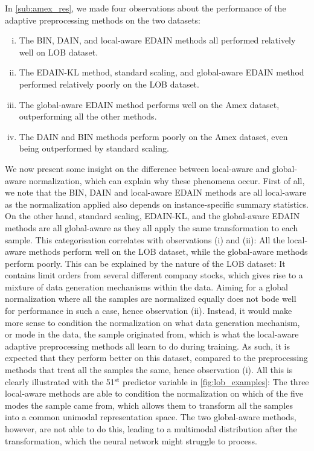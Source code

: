 \documentclass{statsmsc}
\begin{document}
{In \cref{sub:amex_res}, we made four observations about the performance of the adaptive
preprocessing methods on the two datasets:
\begin{enumerate}[(i)]
    \item The \ac{BIN}, \ac{DAIN}, and local-aware \ac{EDAIN} methods
        all performed relatively well on \ac{LOB} dataset.
    \item The EDAIN-KL method, standard scaling, and global-aware EDAIN method performed
        relatively poorly on the \ac{LOB} dataset.
    \item The global-aware \ac{EDAIN} method performs well on the Amex dataset,
        outperforming all the other methods.
    \item The \ac{DAIN} and \ac{BIN} methods perform poorly on the Amex dataset,
        even being outperformed by standard scaling.
\end{enumerate}
We now present some insight on the difference between local-aware and global-aware
normalization, which can explain why these phenomena occur.
%
First of all, we note that the \ac{BIN}, \ac{DAIN} and local-aware \ac{EDAIN} methods are
all local-aware as the normalization applied also depends on instance-specific summary statistics.
On the other hand, standard scaling, \ac{EDAIN-KL}, and the global-aware \ac{EDAIN} methods are
all global-aware as they all apply the same transformation to each sample. This categorisation
correlates with observations (i) and (ii): All the local-aware methods perform well on the
\ac{LOB} dataset, while the global-aware methods perform poorly.
This can be explained by the nature of the \ac{LOB} dataset: It contains limit orders from several
different company stocks, which gives rise to a mixture of data generation mechanisms within the
data. Aiming for a global normalization where all the samples are normalized equally does not bode
well for performance in such a case, hence observation (ii). Instead, it would make more sense to
condition the normalization on what data generation mechanism, or mode in the data, the sample
originated from, which is what the local-aware adaptive preprocessing methods
all learn to do during training. As such, it is expected that they perform better on this dataset,
compared to the preprocessing methods that treat all the samples the same, hence observation (i).
All this is clearly illustrated with the 51$^{\textrm{st}}$ predictor variable
in \cref{fig:lob_examples}:
The three local-aware methods are able to condition the normalization on which
of the five modes the sample came from, which allows them to transform all the samples into a common
unimodal representation space. The two global-aware methods, however, are not able to do this,
leading to a multimodal distribution after the transformation, which the neural network might
struggle to process.

}
\end{document}
